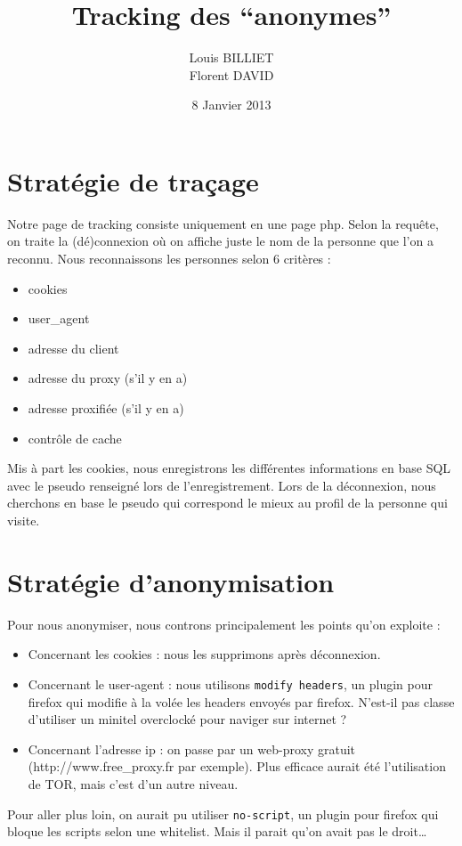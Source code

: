 \documentclass[oneside,10pt]{article}
\begin{document}
\title{Tracking des ``anonymes''}
\author{Louis BILLIET \\ Florent DAVID}
\date{8 Janvier 2013}
\maketitle

\section{Strat\'egie de tra\c cage}
Notre page de tracking consiste uniquement en une page php.
Selon la requ\^ete, on traite la (d\'e)connexion o\`u on affiche juste le nom de la personne que l'on a reconnu.
Nous reconnaissons les personnes selon 6 crit\`eres :
\begin{itemize}
\item cookies
\item user\_agent
\item adresse du client
\item adresse du proxy (s'il y en a)
\item adresse proxifi\'ee (s'il y en a)
\item contr\^ole de cache
\end{itemize}
Mis \`a part les cookies, nous enregistrons les diff\'erentes informations en base SQL avec le pseudo renseign\'e lors de l'enregistrement.
Lors de la d\'econnexion, nous cherchons en base le pseudo qui correspond le mieux au profil de la personne qui visite.

\section{Strat\'egie d'anonymisation}
Pour nous anonymiser, nous controns principalement les points qu'on exploite :
\begin{itemize}
\item Concernant les cookies : nous les supprimons apr\`es d\'econnexion.
\item Concernant le user-agent : nous utilisons \verb+modify headers+, un plugin pour firefox qui modifie \`a la vol\'ee les headers envoy\'es par firefox.
N'est-il pas classe d'utiliser un minitel overclock\'e pour naviger sur internet ?
\item Concernant l'adresse ip : on passe par un web-proxy gratuit (http://www.free\_proxy.fr par exemple).
Plus efficace aurait \'et\'e l'utilisation de TOR, mais c'est d'un autre niveau.
\end{itemize}
Pour aller plus loin, on aurait pu utiliser \verb+no-script+, un plugin pour firefox qui bloque les scripts selon une whitelist.
Mais il parait qu'on avait pas le droit\ldots
\end{document}
